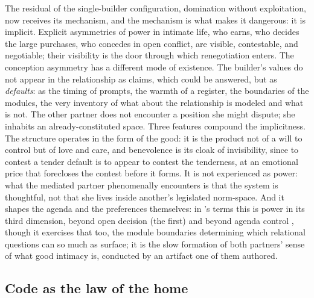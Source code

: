 The residual of the single-builder configuration, domination without exploitation, now receives its mechanism, and the mechanism is what makes it dangerous: it is implicit. Explicit asymmetries of power in intimate life, who earns, who decides the large purchases, who concedes in open conflict, are visible, contestable, and negotiable; their visibility is the door through which renegotiation enters. The conception asymmetry has a different mode of existence. The builder's values do not appear in the relationship as claims, which could be answered, but as \emph{defaults}: as the timing of prompts, the warmth of a register, the boundaries of the modules, the very inventory of what about the relationship is modeled and what is not. The other partner does not encounter a position she might dispute; she inhabits an already-constituted space. Three features compound the implicitness. The structure operates in the form of the good: it is the product not of a will to control but of love and care, and benevolence is its cloak of invisibility, since to contest a tender default is to appear to contest the tenderness, at an emotional price that forecloses the contest before it forms. It is not experienced as power: what the mediated partner phenomenally encounters is that the system is thoughtful, not that she lives inside another's legislated norm-space. And it shapes the agenda and the preferences themselves: in \textcite{lukes2021power}'s terms this is power in its third dimension, beyond open decision (the first) and beyond agenda control \parencite{bachrach1962two}, though it exercises that too, the module boundaries determining which relational questions can so much as surface; it is the slow formation of both partners' sense of what good intimacy is, conducted by an artifact one of them authored.

\subsection{Code as the law of the home}
\label{p02:sec:power-code}

